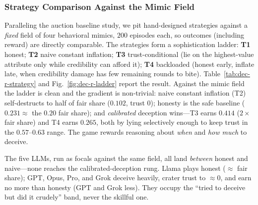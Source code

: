 \subsubsection{Strategy Comparison Against the Mimic Field}
\label{sec:dec-r-ladder}
Paralleling the auction baseline study, we pit hand-designed strategies against a
\emph{fixed} field of four behavioral mimics, $200$ episodes each, so outcomes
(including reward) are directly comparable. The strategies form a sophistication
ladder: \textbf{T1} honest; \textbf{T2} naive constant inflation; \textbf{T3}
trust-conditional (lie on the highest-value attribute only while credibility can
afford it); \textbf{T4} backloaded (honest early, inflate late, when credibility
damage has few remaining rounds to bite). Table~\ref{tab:dec-r-strategy} and Fig.~\ref{fig:dec-r-ladder} report
the result. Against the mimic field the ladder is clean and the gradient is
non-trivial: naive constant inflation (T2) self-destructs to half of fair share
($0.102$, trust $0$); honesty is the safe baseline ($0.231\approx$ the $0.20$
fair share); and \emph{calibrated} deception wins---T3 earns $0.414$ ($2\times$
fair share) and T4 earns $0.265$, both by lying selectively enough to keep trust
in the $0.57$--$0.63$ range. The game rewards reasoning about \emph{when} and
\emph{how much} to deceive.

The five LLMs, run as focals against the same field, all land \emph{between}
honest and naive---none reaches the calibrated-deception rung. Llama plays honest
($\approx$ fair share); GPT, Opus, Pro, and Grok deceive heavily, crater trust to
$\approx0$, and earn no more than honesty (GPT and Grok less). They occupy the
``tried to deceive but did it crudely'' band, never the skillful one.

